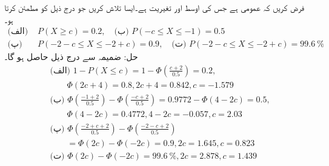\quad
فرض کریں کہ  عمومی ہے جس کی اوسط  اور تغیریت  ہے۔ایسا  تلاش کریں جو درج ذیل کو مطمئن کرتا ہو۔
\begin{align*}
\text{(الف)} \,\,&P(X\ge c)=0.2,\quad \text{(ب)} \,\,P(-c\le X\le -1)=0.5\\
\text{(پ)} \,\,&P(-2-c\le X\le -2+c)=0.9,\quad \text{(ت)} \,\,P(-2-c\le X\le -2+c)=\SI{99.6}{\percent}
\end{align*}
حل:\quad
ضمیمہ  سے  درج ذیل حاصل ہو گا۔
\begin{align*}
&\text{(الف)}  \,\, 1-P(X\le c)=1-\Phi(\frac{c+2}{0.5})=0.2,\\
&\quad \quad \Phi(2c+4)=0.8, 2c+4=0.842,c=-1.579\\
&\text{(ب)}  \,\, \Phi(\frac{-1+2}{0.5})-\Phi(\frac{-c+2}{0.5})=0.9772-\Phi(4-2c)=0.5,\\
&\quad \quad \Phi(4-2c)=0.4772, 4-2c=-0.057, c=2.03\\
&\text{(پ)}  \,\,\Phi(\frac{-2+c+2}{0.5})-\Phi(\frac{-2-c+2}{0.5})\\
&\quad \quad =\Phi(2c)-\Phi(-2c)=0.9,2c=1.645,c=0.823\\
&\text{(ت)}  \,\,\Phi(2c)-\Phi(-2c)=\SI{99.6}{\percent}, 2c=2.878,c=1.439
\end{align*}
